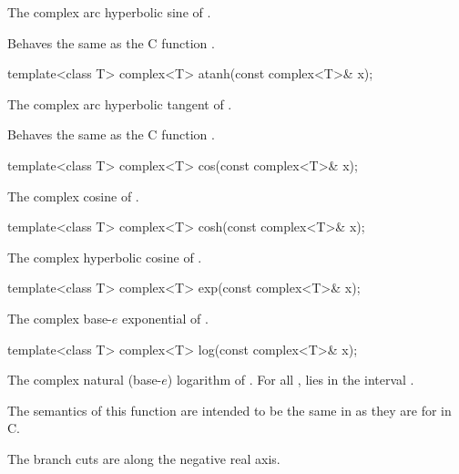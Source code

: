 \begin{itemdescr}
\pnum
\returns
The complex arc hyperbolic sine of .

\pnum
\remarks
Behaves the same as the C function .
\end{itemdescr}

%
%
\begin{itemdecl}
template<class T> complex<T> atanh(const complex<T>& x);
\end{itemdecl}

\begin{itemdescr}
\pnum
\returns
The complex arc hyperbolic tangent of .

\pnum
\remarks
Behaves the same as the C function .
\end{itemdescr}

%
\begin{itemdecl}
template<class T> complex<T> cos(const complex<T>& x);
\end{itemdecl}

\begin{itemdescr}
\pnum
\returns
The complex cosine of .
\end{itemdescr}

%
\begin{itemdecl}
template<class T> complex<T> cosh(const complex<T>& x);
\end{itemdecl}

\begin{itemdescr}
\pnum
\returns
The complex hyperbolic cosine of .
\end{itemdescr}

%
\begin{itemdecl}
template<class T> complex<T> exp(const complex<T>& x);
\end{itemdecl}

\begin{itemdescr}
\pnum
\returns
The complex base-$e$ exponential of .
\end{itemdescr}

%
\begin{itemdecl}
template<class T> complex<T> log(const complex<T>& x);
\end{itemdecl}

\begin{itemdescr}
\pnum
\returns
The complex natural (base-$e$) logarithm of . For all ,
 lies in the interval \crange{$-\pi$}{$\pi$}.
\begin{note}
The semantics of this function are intended to be the same in \Cpp{}
as they are for  in C.
\end{note}

\pnum
\remarks
The branch cuts are along the negative real axis.
\end{itemdescr}

